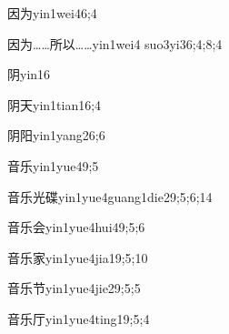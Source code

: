 \begin{verbete}{因为}{yin1wei4}{6;4}
\end{verbete}

\begin{verbete}{因为……所以……}{yin1wei4 suo3yi3}{6;4;8;4}
\end{verbete}

\begin{verbete}{阴}{yin1}{6}
\end{verbete}

\begin{verbete}{阴天}{yin1tian1}{6;4}
\end{verbete}

\begin{verbete}{阴阳}{yin1yang2}{6;6}
\end{verbete}

\begin{verbete}{音乐}{yin1yue4}{9;5}
\end{verbete}

\begin{verbete}{音乐光碟}{yin1yue4guang1die2}{9;5;6;14}
\end{verbete}

\begin{verbete}{音乐会}{yin1yue4hui4}{9;5;6}
\end{verbete}

\begin{verbete}{音乐家}{yin1yue4jia1}{9;5;10}
\end{verbete}

\begin{verbete}{音乐节}{yin1yue4jie2}{9;5;5}
\end{verbete}

\begin{verbete}{音乐厅}{yin1yue4ting1}{9;5;4}
\end{verbete}

